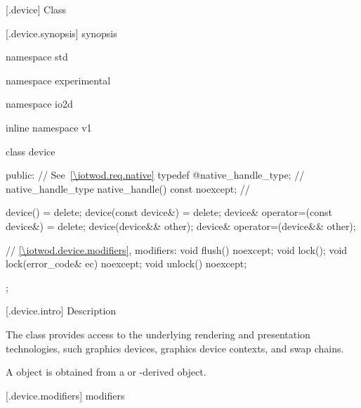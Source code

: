  [\iotwod.device] {Class }

 [\iotwod.device.synopsis] { synopsis}

\begin{codeblock}
namespace std { namespace experimental { namespace io2d { inline namespace v1 {
  class device {
  public:
    // See~\ref{\iotwod.req.native}
    typedef @\impdef@ native_handle_type; //     \expos
    native_handle_type native_handle() const noexcept; // \expos

    device() = delete;
    device(const device&) = delete;
    device& operator=(const device&) = delete;
    device(device&& other);
    device& operator=(device&& other);

    // \ref{\iotwod.device.modifiers}, modifiers:
    void flush() noexcept;
    void lock();
    void lock(error_code& ec) noexcept;
    void unlock() noexcept;
  };
} } } }
\end{codeblock}

 [\iotwod.device.intro] { Description}

\pnum
{}
The  class provides access to the underlying rendering and 
presentation technologies, such graphics devices, graphics device contexts, and swap chains.

\pnum
A  object is obtained from a  or -derived object.

 [\iotwod.device.modifiers] { modifiers}

